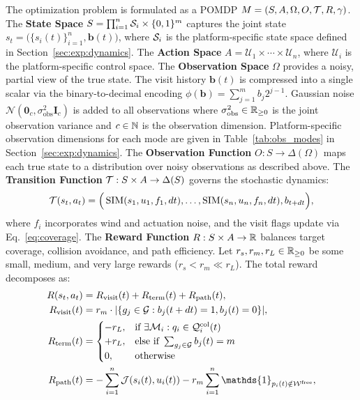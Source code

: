\documentclass{article}
\providecommand{\free}{\mathrm{free}}
\providecommand{\col}{\mathrm{col}}
\begin{document}
The optimization problem is formulated as a POMDP $M = (S, A, \Omega, O, \mathcal{T}, R, \gamma)$. The \textbf{State Space} $S = \prod_{i=1}^n \mathcal{S}_i \times \{0,1\}^m$ captures the joint state $s_t = \big(\{s_i(t)\}_{i=1}^n,  \mathbf{b}(t)\big)$, where $\mathcal{S}_i$ is the platform-specific state space defined in Section~\ref{sec:exp:dynamics}. The \textbf{Action Space} $A = \mathcal{U}_1 \times \cdots \times \mathcal{U}_n$, where $\mathcal{U}_i$ is the platform-specific control space. The \textbf{Observation Space} $\Omega$ provides a noisy, partial view of the true state. The visit history $\mathbf{b}(t)$ is compressed into a single scalar via the binary-to-decimal encoding $\phi(\mathbf{b}) = \sum_{j=1}^m b_j 2^{j-1}$. Gaussian noise $\mathcal{N}(\mathbf{0}_c, \sigma_\mathrm{obs}^2 \mathbf{I}_c)$ is added to all observations where $\sigma_\mathrm{obs}^2 \in \mathbb{R}_{\geq 0}$ is the joint observation variance and $c \in \mathbb{N}$ is the observation dimension. Platform-specific observation dimensions for each mode are given in Table~\ref{tab:obs_modes} in Section~\ref{sec:exp:dynamics}. The \textbf{Observation Function} $O : S \to \Delta(\Omega)$ maps each true state to a distribution over noisy observations as described above. The \textbf{Transition Function} $\mathcal{T} : S \times A \to \Delta(S)$ governs the stochastic dynamics:
\begin{equation}
    \mathcal{T}(s_t, a_t) = \Big(\operatorname{SIM}(s_1, u_1, f_1, dt), \ldots, \operatorname{SIM}(s_n, u_n, f_n, dt),  b_{t+dt}\Big), \label{eq:transition}
\end{equation}
where $f_i$ incorporates wind and actuation noise, and the visit flags update via Eq.~\eqref{eq:coverage}. The \textbf{Reward Function} $R : S \times A \to \mathbb{R}$ balances target coverage, collision avoidance, and path efficiency. Let $r_s, r_m, r_L \in \mathbb{R}_{\geq 0}$ be some small, medium, and very large rewards ($r_s < r_m \ll r_L$). The total reward decomposes as:
\begin{alignat}{2}
    R(s_t, a_t) &= \rvisit(t) + \rterm(t) + \rpath(t), \label{eq:reward}\\
    \rvisit(t)  &= r_m \cdot |\{g_j \in \goals : b_j(t + dt) = 1,  b_j(t) = 0\}|, \label{eq:r_visit} \\
    \rterm(t)   &=
    \begin{cases}
        -r_L, & \text{if } \exists \mathcal{M}_i: q_i \in \config_i^{\col}(t) \\
        +r_L, & \text{else if } \sum_{g_j \in \goals} b_j(t) = m \\
        0,    & \text{otherwise}
    \end{cases} \label{eq:r_term} \\
    \rpath(t)   &= - \sum_{i=1}^n \mathcal{J}(s_i(t), u_i(t))
                   - r_m \sum_{i=1}^n \mathds{1}_{p_i(t) \notin \wspace^{\free}}, \label{eq:r_path}
\end{alignat}
\end{document}
